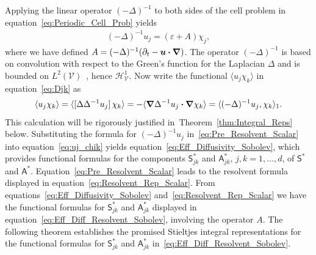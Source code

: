 \documentclass[leqno,onefignum,onetabnum]{siamltex1213}
\newcommand{\thmref}[1]{Theorem~\ref{#1}}
\newcommand{\Vc}{\mathcal{V}}
\newcommand{\Sm}{\mathsf{S}}
\newcommand{\Am}{\mathsf{A}}
\newcommand{\Hs}{\mathscr{H}}
\newcommand\bnabla{\mbox{\boldmath${\nabla}$}}
\providecommand\bcdot{\boldsymbol{\cdot}}
\newcommand{\vecu}{\boldsymbol{u}}
\begin{document}
Applying the linear operator $(-\Delta)^{-1}$ to both sides of the cell
problem in equation~\eqref{eq:Periodic_Cell_Prob} yields
%
\begin{align}\label{eq:Pre_Resolvent_Scalar}
  (-\Delta)^{-1}u_j=(\varepsilon+A)\chi_j,
\end{align}
%
where we have defined $A=(-\Delta)^{-1}(\partial_t-\vecu \bcdot\bnabla)$. The
operator $(-\Delta)^{-1}$ is based on convolution with respect to
the Green's function for the Laplacian $\Delta$ and is bounded on  
$L^2(\Vc)$~\cite{Stakgold:BVP:2000}, hence $\Hs^1_{\Vc}$. Now write
the functional $\langle u_j\chi_k\rangle$ in equation~\eqref{eq:Djk}
as~\cite{Pavliotis:PHD_Thesis}    
%
\begin{align}\label{eq:uj_chik}
  \langle u_j\chi_k\rangle=\langle[\Delta\Delta^{-1}u_j]\,\chi_k\rangle
       =-\langle\bnabla \Delta^{-1}u_j\bcdot\bnabla \chi_k\rangle
       =\langle(-\Delta)^{-1}u_j,\chi_k\rangle_1.
\end{align}
%
This calculation will be rigorously justified
in~\thmref{thm:Integral_Reps} below. Substituting the 
formula for $(-\Delta)^{-1}u_j$ in~\eqref{eq:Pre_Resolvent_Scalar} into
equation~\eqref{eq:uj_chik} yields
equation~\eqref{eq:Eff_Diffusivity_Sobolev}, which provides functional
formulas for the components
$\Sm^*_{jk}$ and $\Am^*_{jk}$, $j,k=1,\ldots,d$, of $\Sm^*$ and $\Am^*$.
Equation~\eqref{eq:Pre_Resolvent_Scalar}   
leads to the resolvent formula displayed in
equation~\eqref{eq:Resolvent_Rep_Scalar}. 
From equations~\eqref{eq:Eff_Diffusivity_Sobolev}
and~\eqref{eq:Resolvent_Rep_Scalar} we have the functional formulas
for $\Sm^*_{jk}$ and $\Am^*_{jk}$ displayed in
equation~\eqref{eq:Eff_Diff_Resolvent_Sobolev}, involving the
operator $A$.
The following theorem establishes the promised Stieltjes integral
representations for the functional formulas for $\Sm^*_{jk}$ and $\Am^*_{jk}$
in~\eqref{eq:Eff_Diff_Resolvent_Sobolev}.
\end{document}

